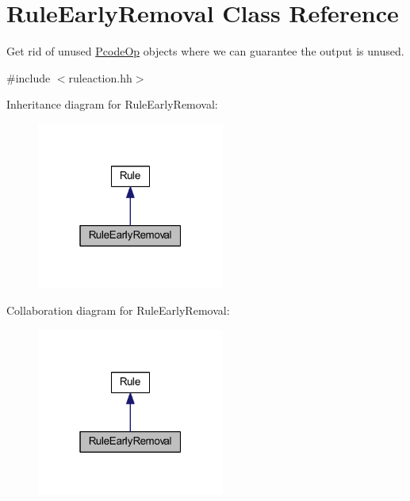 \hypertarget{class_rule_early_removal}{}\section{Rule\+Early\+Removal Class Reference}
\label{class_rule_early_removal}


Get rid of unused \mbox{\hyperlink{class_pcode_op}{Pcode\+Op}} objects where we can guarantee the output is unused.  




{\ttfamily \#include $<$ruleaction.\+hh$>$}



Inheritance diagram for Rule\+Early\+Removal\+:
\nopagebreak
\begin{figure}[H]
\begin{center}
\leavevmode
\includegraphics[width=175pt]{class_rule_early_removal__inherit__graph}
\end{center}
\end{figure}


Collaboration diagram for Rule\+Early\+Removal\+:
\nopagebreak
\begin{figure}[H]
\begin{center}
\leavevmode
\includegraphics[width=175pt]{class_rule_early_removal__coll__graph}
\end{center}
\end{figure}
